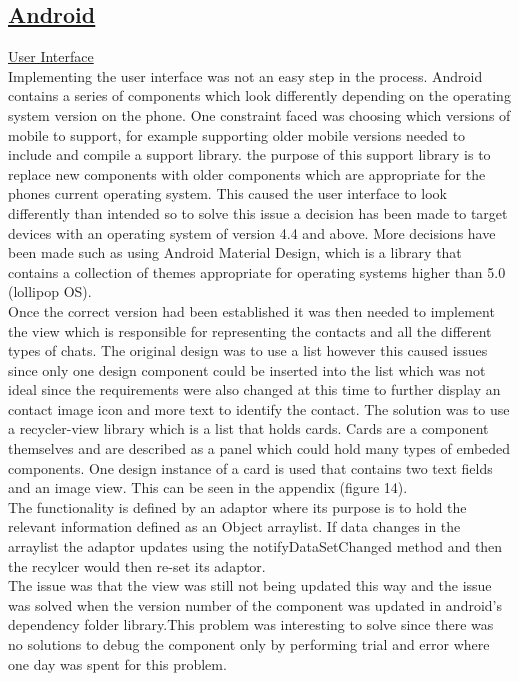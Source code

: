 \documentclass{article}
\begin{document}
\begin{enumerate}
	\subsection{\underline{\textbf{Android}}}
	\underline{User Interface}\\
	Implementing the user interface was not an easy step in the process. Android contains a series of components which look differently depending on the operating system version on the phone. One constraint faced was choosing which versions of mobile to support, for example supporting older mobile versions needed to include and compile a support library. the purpose of this support library is to replace new components with older components which are appropriate for the phones current operating system. This caused the user interface to look differently than intended so to solve this issue a decision has been made to target devices with an operating system of version 4.4 and above. More decisions have been made such as using Android Material Design, which is a library that contains a collection of themes appropriate for operating systems higher than 5.0 (lollipop OS). \\
	Once the correct version had been established it was then needed to implement the view which is responsible for representing the contacts and all the different types of chats. The original design was to use a list however this caused issues since only one design component could be inserted into the list which was not ideal since the requirements were also changed at this time to further display an contact image icon and more text to identify the contact. The solution was to use a recycler-view library which is a list that holds cards. Cards are a component themselves and are described as a panel which could hold many types of embeded components. One design instance of a card is used that contains two text fields and an image view. This can be seen in the appendix (figure 14). \\
	The functionality is defined by an adaptor where its purpose is to hold the relevant information defined as an Object arraylist. If data changes in the arraylist the adaptor updates using the notifyDataSetChanged method and then the recylcer would then re-set its adaptor.\\
	The issue was that the view was still not being updated this way and the issue was solved when the version number of the component was updated in android's dependency folder library.This problem was interesting to solve since there was no solutions to debug the component only by performing trial and error where one day was spent for this problem.\\
	

\end{enumerate}
\end{document}
